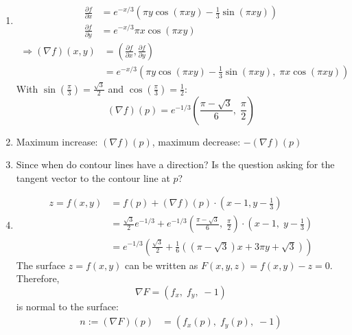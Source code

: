 \documentclass[11pt]{article}
\begin{document}
\begin{solution}
	\begin{enumerate}
		\item
		      $$
			      \begin{aligned}
				      \frac{\partial f}{\partial x} & = e^{-x/3} \left( \pi y \cos(\pi xy) - \frac{1}{3} \sin(\pi xy) \right) \\
				      \frac{\partial f}{\partial y} & = e^{-x/3} \pi x \cos(\pi xy)
			      \end{aligned}
		      $$
		      $$
			      \begin{aligned}
				      \Rightarrow (\nabla f)(x,y) & = \left( \frac{\partial f}{\partial x}, \frac{\partial f}{\partial y} \right)                  \\
				                                  & = e^{-x/3} \left( \pi y \cos(\pi xy) - \frac{1}{3} \sin(\pi xy), \; \pi x \cos(\pi xy) \right)
			      \end{aligned}
		      $$
		      With $\sin(\frac{\pi}{3}) = \frac{\sqrt{3}}{2}$ and $\cos(\frac{\pi}{3}) = \frac{1}{2}$:
		      $$
			      (\nabla f)(p) = e^{-1/3} \left( \frac{\pi - \sqrt{3}}{6}, \; \frac{\pi}{2} \right)
		      $$
		\item
		      Maximum increase: $(\nabla f)(p)$, maximum decrease: $-(\nabla f)(p)$
		\item
		      Since when do contour lines have a direction? Is the question asking for the tangent vector to the contour line at $p$?
		\item
		      $$
			      \begin{aligned}
				      z = f(x, y) & = f(p) + (\nabla f)(p) \cdot (x - 1, y - \frac{1}{3})                                                                                \\
				                  & = \frac{\sqrt{3}}{2} e^{-1/3} + e^{-1/3} \left( \frac{\pi - \sqrt{3}}{6}, \; \frac{\pi}{2} \right) \cdot (x - 1, \; y - \frac{1}{3}) \\
				                  & = e^{-1/3} \left( \frac{\sqrt{3}}{2} + \frac{1}{6} \left( (\pi - \sqrt{3}) x + 3 \pi y + \sqrt{3} \right) \right)
			      \end{aligned}
		      $$
		      The surface $z = f(x, y)$ can be written as $F(x, y, z) = f(x, y) - z = 0$. Therefore,
		      $$
			      \nabla F = (f_x, \; f_y, \; -1)
		      $$
		      is normal to the surface:
		      $$
			      \begin{aligned}
				      n := (\nabla F)(p) & = \left( f_x(p), \; f_y(p), \; -1\right)                                            \\

\end{aligned}$$
\end{enumerate}
\end{solution}
\end{document}
